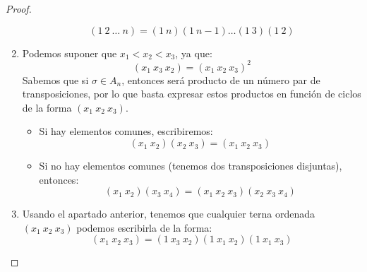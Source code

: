 \begin{prop}
\begin{proof}
\begin{enumerate}[label=(\alph*)]
                \begin{equation*}
                    (1\ 2\ \ldots\ n) = (1\ n)(1\ n-1)\ldots (1\ 3)(1\ 2)
                \end{equation*}
            \item Podemos suponer que $x_1<x_2<x_3$, ya que:
                \begin{equation*}
                    (x_1\ x_3\ x_2) = {(x_1\ x_2\ x_3)}^{2}
                \end{equation*}
                Sabemos que si $\sigma\in A_n$, entonces será producto de un número par de transposiciones, por lo que basta expresar estos productos en función de ciclos de la forma $(x_1\ x_2\ x_3)$.
                \begin{itemize}
                    \item Si hay elementos comunes, escribiremos:
                        \begin{equation*}
                            (x_1\ x_2)(x_2\ x_3) = (x_1\ x_2\ x_3)
                        \end{equation*}
                    \item Si no hay elementos comunes (tenemos dos transposiciones disjuntas), entonces:
                        \begin{equation*}
                            (x_1\ x_2)(x_3\ x_4) = (x_1\ x_2\ x_3)(x_2\ x_3\ x_4)
                        \end{equation*}
                \end{itemize}
            \item Usando el apartado anterior, tenemos que cualquier terna ordenada $(x_1\ x_2\ x_3)$ podemos escribirla de la forma:
                \begin{equation*}
                    (x_1\ x_2\ x_3) = (1\ x_3\ x_2)(1\ x_1\ x_2)(1\ x_1\ x_3)
                \end{equation*}
        \end{enumerate}
    \end{proof}
\end{prop}


